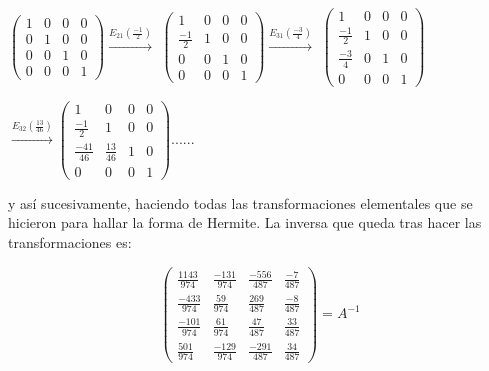 \documentclass[11pt, a4paper]{article}
\newif\IfInSansMode
\theoremstyle{theorem-style}
\theoremstyle{definition-style}
\theoremstyle{remark-style}
\theoremstyle{example-style}
\begin{document}
$
\begin{pmatrix}
1 & 0 & 0 & 0 \\
0 & 1 & 0 & 0 \\
0 & 0 & 1 & 0 \\
0 & 0 & 0 & 1
\end{pmatrix} \xrightarrow{E_{21}(\frac{-1}{2})}
$
$
\begin{pmatrix}
1 & 0 & 0 & 0 \\
\frac{-1}{2} & 1 & 0 & 0 \\
0 & 0 & 1 & 0 \\
0 & 0 & 0 & 1
\end{pmatrix} \xrightarrow{E_{31}(\frac{-3}{4})}
$
$
\begin{pmatrix}
1 & 0 & 0 & 0 \\
\frac{-1}{2} & 1 & 0 & 0 \\
\frac{-3}{4} & 0 & 1 & 0 \\
0 & 0 & 0 & 1 
\end{pmatrix} $

$\xrightarrow{E_{32}(\frac{13}{46})}
\begin{pmatrix}
1 & 0 & 0 & 0 \\
\frac{-1}{2} & 1 & 0 & 0 \\
\frac{-41}{46} & \frac{13}{46} & 1 & 0 \\
0 & 0 & 0 & 1
\end{pmatrix}......$

y así sucesivamente, haciendo todas las transformaciones elementales que se hicieron para hallar la forma de Hermite. La inversa que queda tras hacer las transformaciones es:

$$\begin{pmatrix}
\frac{1143}{974} & \frac{-131}{974} & \frac{-556}{487} & \frac{-7}{487} \\
\frac{-433}{974} & \frac{59}{974} & \frac{269}{487} & \frac{-8}{487} \\
\frac{-101}{974} & \frac{61}{974} & \frac{47}{487} & \frac{33}{487} \\
\frac{501}{974} & \frac{-129}{974} & \frac{-291}{487} & \frac{34}{487}
\end{pmatrix} =  A^{-1}$$




\end{document}
